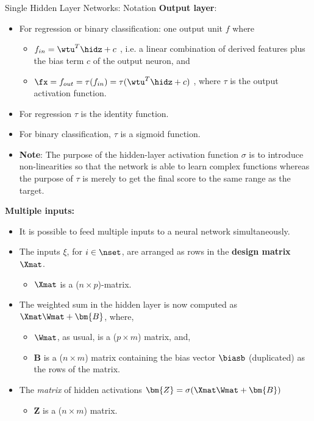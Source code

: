 \documentclass[11pt,compress,t,notes=noshow, xcolor=table]{beamer}
\begin{document}
\begin{vbframe}{Single Hidden Layer Networks: Notation}
  \textbf{Output layer}:
  \begin{itemize}
    \vspace{4mm}
    \item For regression or binary classification: one output unit $f$ where
      \begin{itemize}
        \item $f_{in} = \wtu^T \hidz + c$ , i.e. a linear combination of derived features plus the bias term $c$ of the output neuron, and
        \vspace{2mm}
        \item $\fx= f_{out} = \tau(f_{in}) = \tau(\wtu^T \hidz + c)$ , where $\tau$ is the output activation function.
      \end{itemize}
    \item For regression $\tau$ is the identity function.
    \item For binary classification, $\tau$ is a sigmoid function.
    \item \textbf{Note}: The purpose of the hidden-layer activation function $\sigma$ is to introduce non-linearities so that the network is able to learn complex functions whereas the purpose of $\tau$ is merely to get the final score to the same range as the target.
  \end{itemize}

\framebreak 

  \textbf{%
  Multiple inputs:}
  \begin{itemize}
    \item It is possible to feed multiple inputs to a neural network simultaneously.
    \vspace{2mm}
    \item The inputs $\xi$, for $i \in \nset$, are arranged as rows in the \textbf{design matrix} $\Xmat$.
    \begin{itemize}
      \item $\Xmat$ is a ($n \times p$)-matrix.
    \end{itemize}
    \vspace{2mm}
    \item The weighted sum in the hidden layer is now computed as $\Xmat\Wmat + \bm{B}$, where,
      \begin{itemize}
        \item $\Wmat$, as usual, is a ($p \times m$) matrix, and,
        \vspace{2mm}
        \item $\bm{B}$ is a ($n \times m$) matrix containing the bias vector $\biasb$ (duplicated) as the rows of the matrix.
      \end{itemize}
    \vspace{2mm}
    \item The \textit{matrix} of hidden activations $\bm{Z} = \sigma(\Xmat\Wmat + \bm{B})$
    \begin{itemize}
      \item $\bm{Z}$ is a ($n \times m$) matrix.
    \end{itemize}
  \end{itemize}


\end{vbframe}
\end{document}
